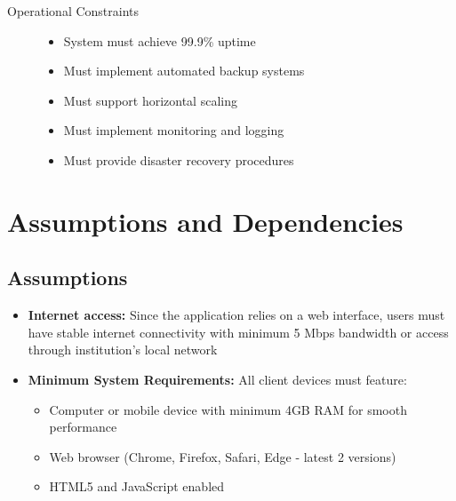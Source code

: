 \documentclass[a4paper, 11pt]{scrreprt}
\begin{document}
\begin{description}
    \item[Operational Constraints]\mbox{}
        \begin{itemize}
            \item System must achieve 99.9\% uptime
            \item Must implement automated backup systems
            \item Must support horizontal scaling
            \item Must implement monitoring and logging
            \item Must provide disaster recovery procedures
        \end{itemize}
\end{description}

\section{Assumptions and Dependencies}

\subsection{Assumptions}
\begin{itemize}
    \item \textbf{Internet access:} Since the application relies on a web interface, users must have stable internet connectivity with minimum 5 Mbps bandwidth or access through institution's local network
    
    \item \textbf{Minimum System Requirements:} All client devices must feature:
        \begin{itemize}
            \item Computer or mobile device with minimum 4GB RAM for smooth performance
            \item Web browser (Chrome, Firefox, Safari, Edge - latest 2 versions)
            \item HTML5 and JavaScript enabled
        \end{itemize}
\end{itemize}
\end{document}
